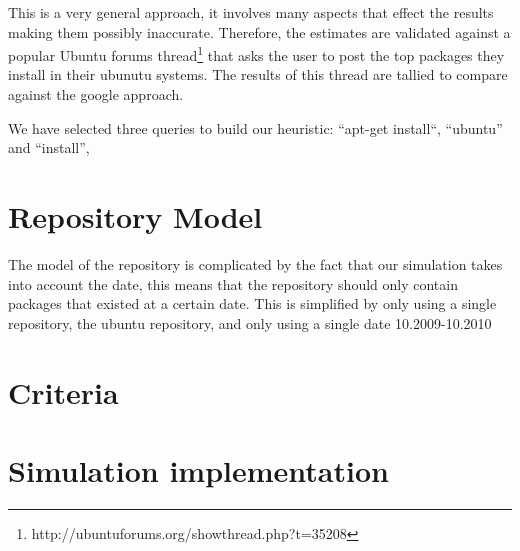 This is a very general approach, it involves many aspects that effect the results making them possibly inaccurate.
Therefore, the estimates are validated against a popular Ubuntu forums thread\footnote{http://ubuntuforums.org/showthread.php?t=35208} 
that asks the user to post the top packages they install in their ubunutu systems. 
The results of this thread are tallied to compare against the google approach.

We have selected three queries to build our heuristic:
``apt-get install``, ``ubuntu'' and ``install'', 


\section{Repository Model}
{}The model of the repository is complicated by the fact that our simulation takes into account the date, this means that the repository should only contain packages that existed at a certain date.
{}This is simplified by only using a single repository, the ubuntu repository, and only using a single date 10.2009-10.2010






\section{Criteria}


\section{Simulation implementation}

